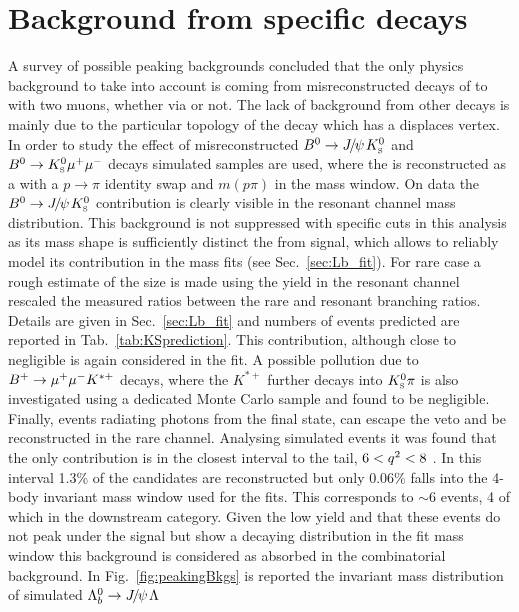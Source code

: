\section{Background from specific decays}

A survey of possible peaking backgrounds concluded that the only physics background
to take into account is coming from misreconstructed decays of \Bz to \KS with
two muons, whether via \jpsi or not. The lack of background from other decays is
mainly due to the particular topology of the \Lz decay which has a displaces vertex.
In order to study the effect of misreconstructed $\Bz\ra\jpsi\KS$ and ${{B}^0}\rightarrow{\ensuremath{{K}^0_{\rm\scriptscriptstyle S}}}{\ensuremath{\mu^+\mu^-}}$ decays
simulated samples are used, where the \KS is reconstructed as a \Lz with a $p\rightarrow \pi$ identity
swap and $m(p\pi)$ in the \Lz mass window.
On data the $\Bz\ra\jpsi\KS$ contribution is clearly visible in the resonant channel mass distribution.
This background is not suppressed with specific cuts in this analysis as its mass shape is sufficiently distinct
the from \Lb signal, which allows to reliably model its contribution in the mass fits (see Sec.~\ref{sec:Lb_fit}).
For rare case a rough estimate of the size is made using the yield in the resonant channel
rescaled the measured ratios between the rare and resonant branching ratios.
Details are given in Sec.~\ref{sec:Lb_fit} and numbers of events predicted are reported in Tab.~\ref{tab:KSprediction}.
This contribution, although close to negligible is again considered in the fit.
A possible pollution due to $B^{+} \rightarrow{\ensuremath{\mu^+\mu^-}} K^{*+}$ decays, where the $K^{*+}$
further decays into $\KS\pi$ is also investigated using a dedicated Monte Carlo sample and found to be negligible.
Finally, \Lb\ra\jpsi\Lz events radiating photons from the final state, can escape the \jpsi veto
and be reconstructed in the rare channel. Analysing simulated events it was found that the only
contribution is in the closest \qsq interval to the \jpsi tail, $6 < {q^2} < 8$ \gevgevcccc.
In this interval 1.3\% of the \Lb\to\jpsi\Lz candidates are reconstructed but only 0.06\%
falls into the 4-body invariant mass window used for the fits. This corresponds to $\sim 6$
events, 4 of which in the downstream category. Given the low yield and that these events do
not peak under the signal but show a decaying distribution in the fit mass window this
background is considered as absorbed in the combinatorial background.
In Fig.~\ref{fig:peakingBkgs} is reported the invariant mass distribution of simulated $\Lb\ra\jpsi\Lz$
